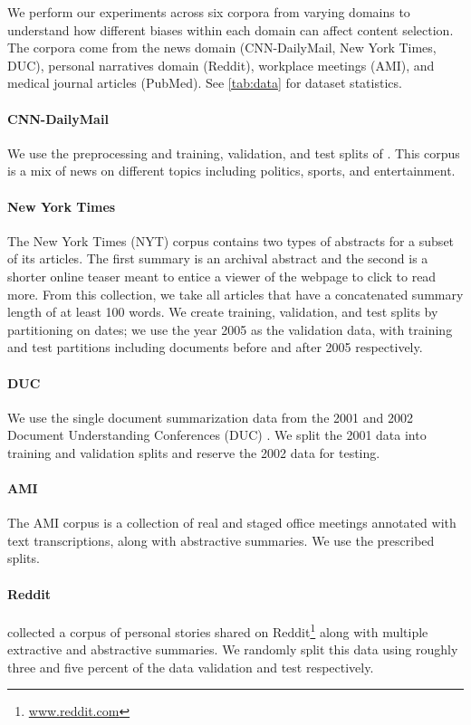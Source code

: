 We perform our experiments across six corpora from varying domains to 
understand how different biases within each domain can affect content 
selection. The corpora come from the news domain
(CNN-DailyMail, New York Times, DUC), personal narratives domain (Reddit),
workplace meetings (AMI), and medical journal articles (PubMed). See 
\autoref{tab:data} for dataset statistics.


\paragraph{CNN-DailyMail} We use the preprocessing and training, validation, 
and test splits
of \citet{see2017get}.
This corpus is a mix of news on different topics including politics,
sports, and entertainment.

\paragraph{New York Times}The New York Times (NYT) corpus \cite{sandhaus2008new} contains
 two types of abstracts for a subset of its articles. The first summary is
an archival abstract and the 
second is a shorter online teaser meant to entice a viewer of the webpage to
click to read more. From this collection, we take all articles that have 
a concatenated summary length of at least 100 words.
We create training, validation, and test splits by partitioning on dates;
we use the year 2005 as the validation data, with training and test partitions
including documents before and after 2005 respectively.

\paragraph{DUC} We use the single document summarization data from the 2001
and 2002
Document Understanding Conferences (DUC) \cite{over2002introduction}. We split the 2001 data into training
and validation splits and reserve the 2002 data for testing.

\paragraph{AMI} The AMI corpus \cite{carletta2005ami} 
is a collection of real and staged office meetings
annotated with text transcriptions, along with abstractive
summaries. We use the prescribed splits. 

\paragraph{Reddit} \citet{ouyang2017crowd} collected a corpus of personal 
    stories shared
 on Reddit\footnote{\url{www.reddit.com}} along with multiple extractive 
 and abstractive summaries. We randomly split this data using roughly three and five percent of the data validation and test respectively.


